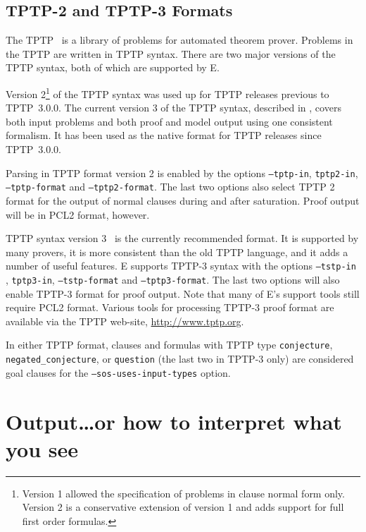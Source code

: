 \documentclass{report}
\begin{document}
\section{TPTP-2 and TPTP-3 Formats}

The TPTP~\cite{Sutcliffe:TPTP-WWW} is a library of
problems for automated theorem prover. Problems in the TPTP are
written in TPTP syntax. There are two major
versions of the TPTP syntax, both of which are supported by E.

Version 2\footnote{Version 1 allowed the specification of problems in
  clause normal form only. Version 2 is a conservative extension of
  version 1 and adds support for full first order formulas.} of the
TPTP syntax was used up for TPTP releases previous to TPTP~3.0.0.  The
current version 3 of the TPTP syntax, described in
\cite{SSCG:IJCAR-2006}, covers both input problems and both proof and
model output using one consistent formalism. It has been used as the
native format for TPTP releases since TPTP~3.0.0.

Parsing in TPTP format version 2 is enabled by the options
\texttt{--tptp-in}, \texttt{tptp2-in}, \texttt{--tptp-format} and
\texttt{--tptp2-format}. The last two options also select TPTP 2
format for the output of normal clauses during and after
saturation. Proof output will be in PCL2 format, however.

TPTP syntax version 3~\cite{SSCG:IJCAR-2006,SSCB:LPAR-2012} is the
currently recommended format. It is supported by many provers, it is
more consistent than the old TPTP language, and it adds a number of
useful features.  E supports TPTP-3 syntax with the options
\texttt{--tstp-in} , \texttt{tptp3-in}, \texttt{--tstp-format} and
\texttt{--tptp3-format}. The last two options will also enable TPTP-3
format for proof output. Note that many of E's support tools still
require PCL2 format. Various tools for processing TPTP-3 proof format
are available via the TPTP web-site, \url{http://www.tptp.org}.

In either TPTP format, clauses and formulas with TPTP type
\texttt{conjecture}, \texttt{negated\_conjecture}, or
\texttt{question} (the last two in TPTP-3 only) are considered goal
clauses for the \texttt{--sos-uses-input-types} option.



\chapter{Output\ldots or how to interpret what you see}
\label{sec:output}
\end{document}
